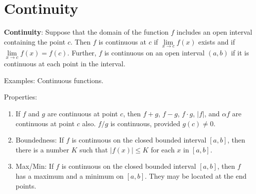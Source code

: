 \documentclass[]{book}
\providecommand{\tightlist}{%
  \setlength{\itemsep}{0pt}\setlength{\parskip}{0pt}}
\theoremstyle{definition}
\theoremstyle{definition}
\theoremstyle{definition}
\theoremstyle{remark}
\begin{document}

\section{Continuity}\label{continuity}

\textbf{Continuity}: Suppose that the domain of the function \(f\)
includes an open interval containing the point \(c\). Then \(f\) is
continuous at \(c\) if \(\lim\limits_{x \to c} f(x)\) exists and if
\(\lim\limits_{x \to c} f(x)=f(c)\). Further, \(f\) is continuous on an
open interval \((a,b)\) if it is continuous at each point in the
interval.

Examples: Continuous functions.

Properties:

\begin{enumerate}
\def\labelenumi{\arabic{enumi}.}
\tightlist
\item
  If \(f\) and \(g\) are continuous at point \(c\), then \(f+g\),
  \(f-g\), \(f \cdot g\), \(|f|\), and \(\alpha f\) are continuous at
  point \(c\) also. \(f/g\) is continuous, provided \(g(c)\ne 0\).
\item
  Boundedness: If \(f\) is continuous on the closed bounded interval
  \([a,b]\), then there is a number \(K\) such that \(|f(x)|\le K\) for
  each \(x\) in \([a,b]\).
\item
  Max/Min: If \(f\) is continuous on the closed bounded interval
  \([a,b]\), then \(f\) has a maximum and a minimum on \([a,b]\). They
  may be located at the end points.
\end{enumerate}
\end{document}
